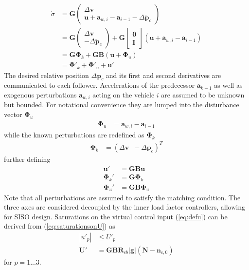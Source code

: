 \documentclass{ifacconf}
\providecommand{\mbf}[1]{\mathbf{#1}}
\newcommand{\idxFollower}{{\ensuremath{i} }}
\newcommand{\idxPredecessor}{{\ensuremath{i-1} }}
\newcommand{\idxAxis}{{\ensuremath{p}}}
\begin{document}
\begin{align}
\dot{{\sigma}} &= \mbf{G}
\begin{pmatrix}
\Delta \mbf{v} \\
\mbf{u} + \mbf{a}_{w,\idxFollower}
 - \mbf{a}_\idxPredecessor -  \Delta \ddot{\mbf{p}}_c
\end{pmatrix}\\
& = \mbf{G}
\begin{pmatrix}
\Delta \mbf{v} \\
 - \Delta \ddot{\mbf{p}}_c
\end{pmatrix} 
+ \mbf{G}
\begin{bmatrix}
{\mbf{0}}\\
{\mbf{I}}
\end{bmatrix}
(\mbf{u} + \mbf{a}_{w,\idxFollower} - \mbf{a}_\idxPredecessor) \\
&= \mbf{G} \mbf{\Phi}_k + \mbf{G} \mbf{B}(
\mbf{u}
 + {\mbf\Phi}_u)
\label{eq:sigmadynconti}\\
&= \mbf{\Phi}'_k + \mbf{\Phi}'_u + \mbf{u}'
\label{eq:sigmadyncontishort}
\end{align}
The  desired relative position $\Delta \mbf{p}_c$ and its first and second derivatives are communicated to each follower. Accelerations of the predecessor $\mbf{a}_{k-1}$ as well as exogenous perturbations $\mbf{a}_{w, \idxFollower} $ acting on the vehicle $i$ are assumed to be unknown but bounded. For notational convenience they are lumped into the disturbance vector $\mbf{\Phi}_u$
\begin{align}
\mbf{\Phi}_u &= \mbf{a}_{w,\idxFollower} - \mbf{a}_\idxPredecessor
\end{align}
while the known perturbations are redefined as $\mbf{\Phi}_k$
\begin{align}
\mbf{\Phi}_k &= 
(
\Delta \mbf{v} \;\;
 - \Delta \ddot{\mbf{p}}_c
)^T
\end{align}
further defining
\begin{align}
\mbf{u}' &= \mbf{GB}\mbf{u}
\label{eq:defu}\\
\mbf{\Phi}_k' &= \mbf{G}\mbf{\Phi}_k \\
\mbf{\Phi}_u' &= \mbf{GB}\mbf{\Phi}_u
\end{align}
Note that all perturbations are assumed to satisfy the matching condition.
The three axes are considered decoupled by the inner load factor controllers, allowing for SISO design.
Saturations on the virtual control input (\ref{eq:defu}) can be derived from (\ref{eq:saturationsonU}) as
\begin{align}
|{u}'_\idxAxis| &\leq {U}'_\idxAxis \\
\mbf{U}' &= \mbf{GB} \mbf{R}_{eb} |\mbf{g}|(\mbf{N}-\mbf{n}_{c,0})
\end{align}
for $\idxAxis=1...3$.
\end{document}
